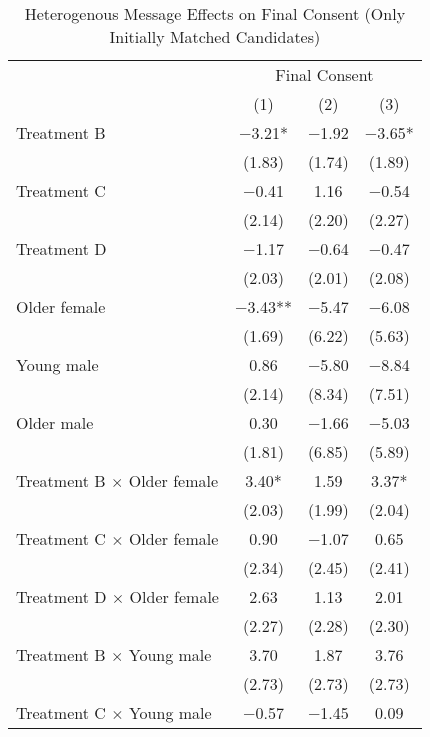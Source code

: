 \documentclass[12pt, a4paper]{article}
\begin{document}
\begin{table}[H]

\caption{\label{tab:lm-consent-interaction-init-reg}Heterogenous Message Effects on Final Consent (Only Initially Matched Candidates)}
\centering
\fontsize{8}{10}\selectfont
\begin{threeparttable}
\begin{tabular}[t]{lccc}
\toprule
\multicolumn{1}{c}{ } & \multicolumn{3}{c}{Final Consent} \\
\cmidrule(l{3pt}r{3pt}){2-4}
  & (1) & (2) & (3)\\
\midrule
Treatment B & \num{-3.21}* & \num{-1.92} & \num{-3.65}*\\
 & (\num{1.83}) & (\num{1.74}) & (\num{1.89})\\
Treatment C & \num{-0.41} & \num{1.16} & \num{-0.54}\\
 & (\num{2.14}) & (\num{2.20}) & (\num{2.27})\\
Treatment D & \num{-1.17} & \num{-0.64} & \num{-0.47}\\
 & (\num{2.03}) & (\num{2.01}) & (\num{2.08})\\
Older female & \num{-3.43}** & \num{-5.47} & \num{-6.08}\\
 & (\num{1.69}) & (\num{6.22}) & (\num{5.63})\\
Young male & \num{0.86} & \num{-5.80} & \num{-8.84}\\
 & (\num{2.14}) & (\num{8.34}) & (\num{7.51})\\
Older male & \num{0.30} & \num{-1.66} & \num{-5.03}\\
 & (\num{1.81}) & (\num{6.85}) & (\num{5.89})\\
Treatment B $\times$ Older female & \num{3.40}* & \num{1.59} & \num{3.37}*\\
 & (\num{2.03}) & (\num{1.99}) & (\num{2.04})\\
Treatment C $\times$ Older female & \num{0.90} & \num{-1.07} & \num{0.65}\\
 & (\num{2.34}) & (\num{2.45}) & (\num{2.41})\\
Treatment D $\times$ Older female & \num{2.63} & \num{1.13} & \num{2.01}\\
 & (\num{2.27}) & (\num{2.28}) & (\num{2.30})\\
Treatment B $\times$ Young male & \num{3.70} & \num{1.87} & \num{3.76}\\
 & (\num{2.73}) & (\num{2.73}) & (\num{2.73})\\
Treatment C $\times$ Young male & \num{-0.57} & \num{-1.45} & \num{0.09}\\

\end{tabular}
\end{threeparttable}
\end{table}
\end{document}

